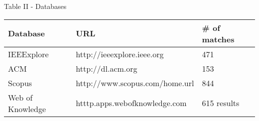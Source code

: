 \centering
Table II - Databases

\begin{tabular}{p{8em} p{15em} p{10em}}
    \bfseries{Database} & \bfseries{URL} & \bfseries{\# of matches} \\
    \hline
    IEEExplore & http://ieeexplore.ieee.org & 471 \\
    ACM & http://dl.acm.org & 153 \\
    Scopus & http://www.scopus.com/home.url & 844 \\
    Web of Knowledge & htttp.apps.webofknowledge.com &  615 results \\
    \hline
\end{tabular}

\raggedright
